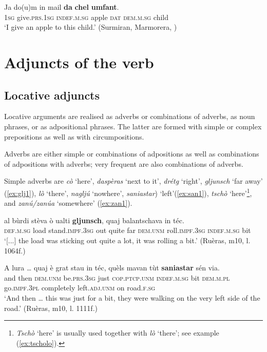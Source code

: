 \ea\label{ex:marm2}
\gll  Ja do(u)m in mail \textbf{da} \textbf{chel} \textbf{umfant}.\\
\textsc{1sg} give.\textsc{prs.1sg} \textsc{indef.m.sg} apple \textsc{dat} \textsc{dem.m.sg} child\\
\glt `I give an apple to this child.' (Surmiran, Marmorera, )
\z

\section{Adjuncts of the verb}

\subsection{Locative adjuncts}
Locative arguments are realised as adverbs or combinations of adverbs, as noun phrases, or as adpositional phrases. The latter are formed with simple or complex prepositions as well as with circumpositions.

Adverbs are either simple or combinations of adpositions as well as combinations of adpositions with adverbs; very frequent are also combinations of adverbs.

Simple adverbs are \textit{cò} `here', \textit{daspèras} `next to it', \textit{drétg} `right', \textit{gljunsch} `far away' (\ref{ex:glj1}), \textit{lò} `there', \textit{nagljú} `nowhere',  \textit{saniastar}) `left'(\ref{ex:san1}), \textit{tschò} `here'\footnote{\textit{Tschò} `here' is usually used together with \textit{lò} `there'; see example (\ref{ex:tscholo}).}, and \textit{zanú/zanúa} `somewhere' (\ref{ex:zan1}).

\ea
\label{ex:glj1}
\gll  [...] al bùrdi stèva ò ualti \textbf{gljunsch}, quaj balantschava in téc.\\
{} \textsc{def.m.sg} load  stand.\textsc{impf.3sg} out quite far \textsc{dem.unm} roll.\textsc{impf.3sg}  \textsc{indef.m.sg} bit\\
\glt `[...] the load was sticking out quite a lot, it was rolling a bit.' (Ruèras, m10, l. 1064f.)
\z

\ea
\label{ex:san1}
\gll A lura … quaj è grat stau in téc, quèls mavan tùt \textbf{saniastar} sén via. \\
and then {} \textsc{dem.unm} be.\textsc{prs.3sg} just \textsc{cop.ptcp.unm} \textsc{indef.m.sg} bit \textsc{dem.m.pl} go.\textsc{impf.3pl} completely left.\textsc{adj.unm} on road.\textsc{f.sg}  \\
\glt `And then … this was just for a bit, they were walking on the very left side of the road.' (Ruèras, m10, l. 1111f.)
\z

